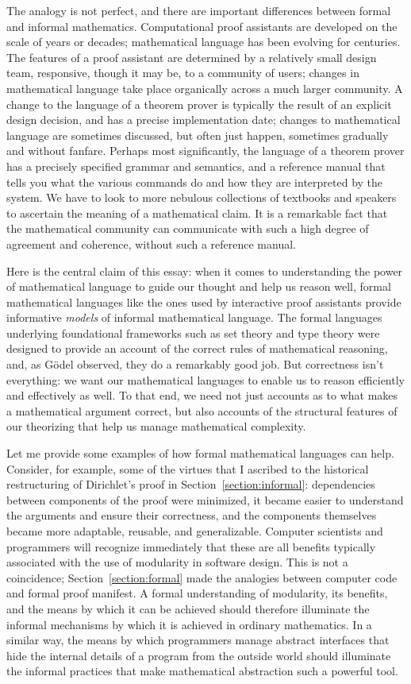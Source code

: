 \documentclass[12pt]{article}
\begin{document}
The analogy is not perfect, and there are important differences between formal and informal mathematics. Computational proof assistants are developed on the scale of years or decades; mathematical language has been evolving for centuries. The features of a proof assistant are determined by a relatively small design team, responsive, though it may be, to a community of users; changes in mathematical language take place organically across a much larger community. A change to the language of a theorem prover is typically the result of an explicit design decision, and has a precise implementation date; changes to mathematical language are sometimes discussed, but often just happen, sometimes gradually and without fanfare. Perhaps most significantly, the language of a theorem prover has a precisely specified grammar and semantics, and a reference manual that tells you what the various commands do and how they are interpreted by the system. We have to look to more nebulous collections of textbooks and speakers to ascertain the meaning of a mathematical claim. It is a remarkable fact that the mathematical community can communicate with such a high degree of agreement and coherence, without such a reference manual.

Here is the central claim of this essay: when it comes to understanding the power of mathematical language to guide our thought and help us reason well, formal mathematical languages like the ones used by interactive proof assistants provide informative \emph{models} of informal mathematical language. The formal languages underlying foundational frameworks such as set theory and type theory were designed to provide an account of the correct rules of mathematical reasoning, and, as G\"odel observed, they do a remarkably good job. But correctness isn't everything: we want our mathematical languages to enable us to reason efficiently and effectively as well. To that end, we need not just accounts as to what makes a mathematical argument correct, but also accounts of the structural features of our theorizing that help us manage mathematical complexity.

Let me provide some examples of how formal mathematical languages can help. Consider, for example, some of the virtues that I ascribed to the historical restructuring of Dirichlet's proof in Section~\ref{section:informal}: dependencies between components of the proof were minimized, it became easier to understand the arguments and ensure their correctness, and the components themselves became more adaptable, reusable, and generalizable. Computer scientists and programmers will recognize immediately that these are all benefits typically associated with the use of modularity in software design. This is not a coincidence; Section~\ref{section:formal} made the analogies between computer code and formal proof manifest. A formal understanding of modularity, its benefits, and the means by which it can be achieved should therefore illuminate the informal mechanisms by which it is achieved in ordinary mathematics. In a similar way, the means by which programmers manage abstract interfaces that hide the internal details of a program from the outside world should illuminate the informal practices that make mathematical abstraction such a powerful tool.
\end{document}
